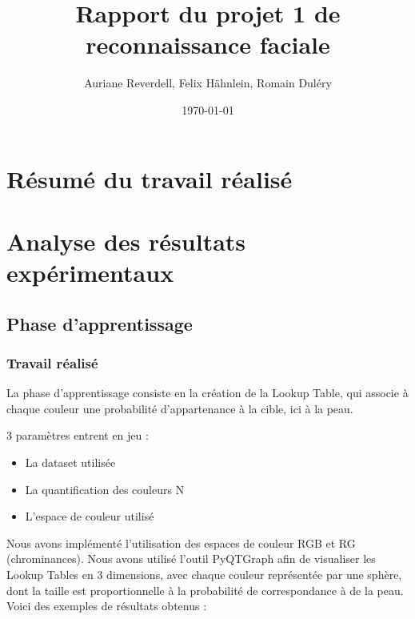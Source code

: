 \documentclass[a4paper,11pt]{article}
\title{Rapport du projet 1 de reconnaissance faciale}
\author{Auriane Reverdell, Felix Hähnlein, Romain Duléry}
\date{\today}
\begin{document}
\maketitle
\vspace{1cm}

\section{Résumé du travail réalisé}
\section{Analyse des résultats expérimentaux}
\subsection{Phase d'apprentissage}

\subsubsection{Travail réalisé}

La phase d'apprentissage consiste en la création de la Lookup Table, qui associe à chaque couleur une probabilité d'appartenance à la cible, ici à la peau.

3 paramètres entrent en jeu :

\begin{itemize}
    \item La dataset utilisée
    \item La quantification des couleurs N
    \item L'espace de couleur utilisé\\
\end{itemize}

Nous avons implémenté l'utilisation des espaces de couleur RGB et RG (chrominances). Nous avons utilisé l'outil PyQTGraph afin de visualiser les Lookup Tables en 3 dimensions, avec chaque couleur représentée par une sphère, dont la taille est proportionnelle à la probabilité de correspondance à de la peau.\\

Voici des exemples de résultats obtenus :
\end{document}
